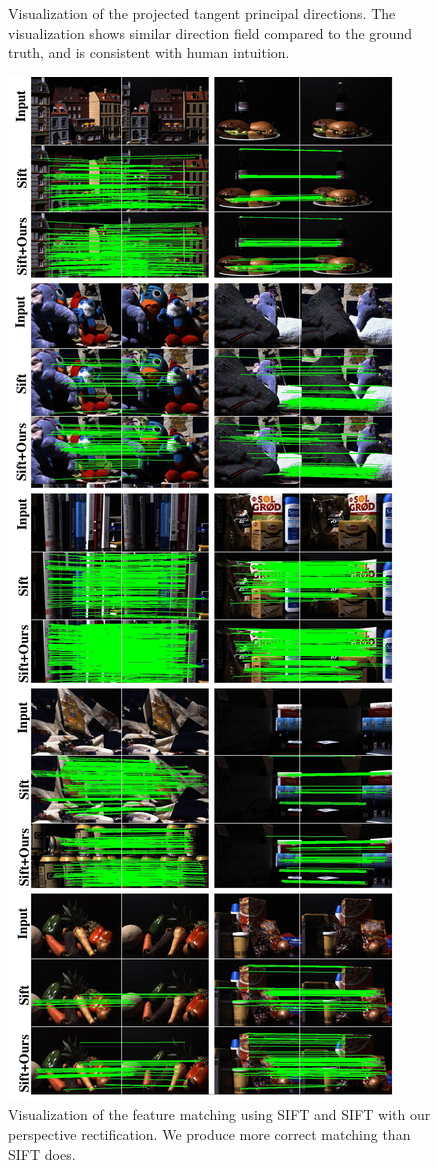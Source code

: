 \begin{figure}
\begin{minipage}{0.49\linewidth}
    \caption{Visualization of the projected tangent principal directions. The visualization shows similar direction field compared to the ground truth, and is consistent with human intuition.}
    \label{fig:vis-supplemental}
\end{minipage}
\begin{minipage}{0.49\linewidth}
    \centering
    \includegraphics[width=0.92\linewidth]{FrameNet/graph/dtu-supplemental.pdf}
    \caption{Visualization of the feature matching using SIFT and SIFT with our perspective rectification. We produce more correct matching than SIFT does.}
    \label{fig:dtu-supplemental}
\end{minipage}
\end{figure}

